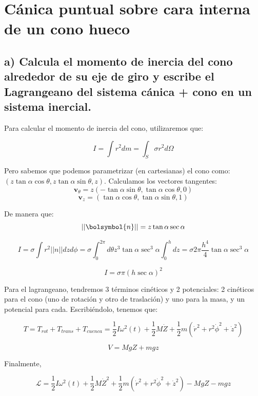 \documentclass[a4paper,12pt]{article}
\begin{document}
\section{ Cánica puntual sobre cara interna de un cono hueco}

\subsection*{a) Calcula el momento de inercia del cono alrededor de su eje de giro y escribe el Lagrangeano del sistema cánica + cono en un sistema inercial.}

Para calcular el momento de inercia del cono, utilizaremos que:

$$I = \int r^2 dm = \int_S \sigma r^2  d\Omega$$

Pero sabemos que podemos parametrizar (en cartesianas) el cono como: $(z \tan\alpha \cos\theta, z \tan\alpha \sin\theta, z)$. Calculamos los vectores tangentes:
$$\boldsymbol{v}_\theta = z (-\tan\alpha \sin\theta,\tan\alpha \cos\theta , 0)$$
$$\boldsymbol{v}_z = (\tan\alpha\cos\theta,\tan\alpha\sin\theta,1)$$

De manera que:
$$||\bolsymbol{n}|| = z\tan\alpha\sec{\alpha}$$

$$I= \sigma \int r^2 ||n||dzd\phi = \sigma\int_0^{2\pi}d\theta z^3 \tan\alpha \sec^3\alpha \int_0^h    dz = \sigma 2\pi \frac{h^4}{4} \tan\alpha \sec^3\alpha$$

$$I = \sigma \pi (h\sec\alpha)^2 $$

Para el lagrangeano, tendremos 3 términos cinéticos y 2 potenciales: 2 cinéticos para el cono (uno de rotación y otro de traslación) y uno para la masa, y un potencial para cada. Escribiéndolo, tenemos que:

$$T = T_{rot} + T_{trans} + T_{cuenca} = \frac{1}{2} I \omega^2(t) + \frac{1}{2} M \dot{Z} + \frac{1}{2} m  (\dot{r}^2 + r^2 \dot{\phi}^2+\dot{z}^2)$$

$$V = M g Z + mgz$$

Finalmente, 

\begin{equation}
  \mathcal{L} = \frac{1}{2} I \omega^2(t) + \frac{1}{2} M \dot{Z}^2 + \frac{1}{2} m  (\dot{r}^2 + r^2 \dot{\phi}^2+\dot{z}^2) - M g Z - mgz
\end{equation}
\end{document}

